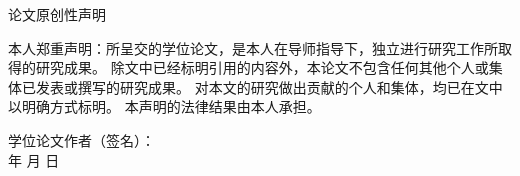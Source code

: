 %
%

\newpage
\vspace*{20pt}
\thispagestyle{empty}
\begin{center}{\heiti 论文原创性声明}\end{center}
\par\vspace*{20pt}
\renewcommand{\baselinestretch}{2}
{
本人郑重声明：所呈交的学位论文，是本人在导师指导下，独立进行研究工作所取得的研究成果。
除文中已经标明引用的内容外，本论文不包含任何其他个人或集体已发表或撰写的研究成果。
对本文的研究做出贡献的个人和集体，均已在文中以明确方式标明。
本声明的法律结果由本人承担。

\vskip 2cm

\hspace*{4cm}学位论文作者（签名）：\hspace{4cm} \hfill \\[1cm]
\hspace*{10cm}年 \hfill  月 \hfill 日\hspace{1cm}\hfill\par}
